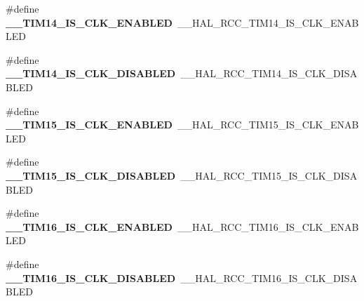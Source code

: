 \begin{DoxyCompactItemize}
\item 
\#define {\bfseries \+\_\+\+\_\+\+T\+I\+M14\+\_\+\+I\+S\+\_\+\+C\+L\+K\+\_\+\+E\+N\+A\+B\+L\+ED}~\+\_\+\+\_\+\+H\+A\+L\+\_\+\+R\+C\+C\+\_\+\+T\+I\+M14\+\_\+\+I\+S\+\_\+\+C\+L\+K\+\_\+\+E\+N\+A\+B\+L\+ED\hypertarget{group___h_a_l___r_c_c___aliased_ga4347652552bdd9de4852bc95885e14ae}{}\label{group___h_a_l___r_c_c___aliased_ga4347652552bdd9de4852bc95885e14ae}

\item 
\#define {\bfseries \+\_\+\+\_\+\+T\+I\+M14\+\_\+\+I\+S\+\_\+\+C\+L\+K\+\_\+\+D\+I\+S\+A\+B\+L\+ED}~\+\_\+\+\_\+\+H\+A\+L\+\_\+\+R\+C\+C\+\_\+\+T\+I\+M14\+\_\+\+I\+S\+\_\+\+C\+L\+K\+\_\+\+D\+I\+S\+A\+B\+L\+ED\hypertarget{group___h_a_l___r_c_c___aliased_gaeb26f1a267eb972d5bfac74e576b1f64}{}\label{group___h_a_l___r_c_c___aliased_gaeb26f1a267eb972d5bfac74e576b1f64}

\item 
\#define {\bfseries \+\_\+\+\_\+\+T\+I\+M15\+\_\+\+I\+S\+\_\+\+C\+L\+K\+\_\+\+E\+N\+A\+B\+L\+ED}~\+\_\+\+\_\+\+H\+A\+L\+\_\+\+R\+C\+C\+\_\+\+T\+I\+M15\+\_\+\+I\+S\+\_\+\+C\+L\+K\+\_\+\+E\+N\+A\+B\+L\+ED\hypertarget{group___h_a_l___r_c_c___aliased_ga2e7ecc7a174a07f86b79de885ebb5280}{}\label{group___h_a_l___r_c_c___aliased_ga2e7ecc7a174a07f86b79de885ebb5280}

\item 
\#define {\bfseries \+\_\+\+\_\+\+T\+I\+M15\+\_\+\+I\+S\+\_\+\+C\+L\+K\+\_\+\+D\+I\+S\+A\+B\+L\+ED}~\+\_\+\+\_\+\+H\+A\+L\+\_\+\+R\+C\+C\+\_\+\+T\+I\+M15\+\_\+\+I\+S\+\_\+\+C\+L\+K\+\_\+\+D\+I\+S\+A\+B\+L\+ED\hypertarget{group___h_a_l___r_c_c___aliased_gae23f2016afbcc226f8eb5c22739ff33e}{}\label{group___h_a_l___r_c_c___aliased_gae23f2016afbcc226f8eb5c22739ff33e}

\item 
\#define {\bfseries \+\_\+\+\_\+\+T\+I\+M16\+\_\+\+I\+S\+\_\+\+C\+L\+K\+\_\+\+E\+N\+A\+B\+L\+ED}~\+\_\+\+\_\+\+H\+A\+L\+\_\+\+R\+C\+C\+\_\+\+T\+I\+M16\+\_\+\+I\+S\+\_\+\+C\+L\+K\+\_\+\+E\+N\+A\+B\+L\+ED\hypertarget{group___h_a_l___r_c_c___aliased_gaf37f50c5f648828da154ddad55c82d0e}{}\label{group___h_a_l___r_c_c___aliased_gaf37f50c5f648828da154ddad55c82d0e}

\item 
\#define {\bfseries \+\_\+\+\_\+\+T\+I\+M16\+\_\+\+I\+S\+\_\+\+C\+L\+K\+\_\+\+D\+I\+S\+A\+B\+L\+ED}~\+\_\+\+\_\+\+H\+A\+L\+\_\+\+R\+C\+C\+\_\+\+T\+I\+M16\+\_\+\+I\+S\+\_\+\+C\+L\+K\+\_\+\+D\+I\+S\+A\+B\+L\+ED\hypertarget{group___h_a_l___r_c_c___aliased_ga74fe7a2ca9ea8792a67e08e34c4b25b5}{}\label{group___h_a_l___r_c_c___aliased_ga74fe7a2ca9ea8792a67e08e34c4b25b5}


\end{DoxyCompactItemize}
